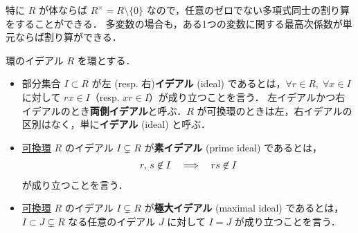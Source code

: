\documentclass[rep_main]{subfiles}
\begin{document}
特に $R$ が体ならば $R^\times = R\setminus \{0\}$ なので，任意のゼロでない多項式同士の割り算をすることができる．
多変数の場合も，ある1つの変数に関する最高次係数が単元ならば割り算ができる．

\begin{mydef}[label=def:ideal-ring]{環のイデアル}
    $R$ を環とする．
    \begin{itemize}
        \item 部分集合 $I \subset R$ が左 (resp. 右)\textbf{イデアル} (ideal) であるとは，$\forall r \in R,\; \forall x \in I$ に対して $rx \in I$（resp. $xr \in I$）が成り立つことを言う．
        左イデアルかつ右イデアルのとき\textbf{両側イデアル}と呼ぶ．$R$ が可換環のときは左，右イデアルの区別はなく，単に\textbf{イデアル} (ideal) と呼ぶ．
        \item \underline{可換環} $R$ のイデアル $I\subsetneq R$ が\textbf{素イデアル} (prime ideal) であるとは，
        \begin{align}
            r,\, s \not\in I \quad \Longrightarrow \quad rs \not\in I
        \end{align}
        が成り立つことを言う．
        \item \underline{可換環} $R$ のイデアル $I \subsetneq R$ が\textbf{極大イデアル} (maximal ideal) であるとは，$I \subset J \subsetneq R$ なる任意のイデアル $J$ に対して $I = J$ が成り立つことを言う．
    \end{itemize}
\end{mydef}
\end{document}

